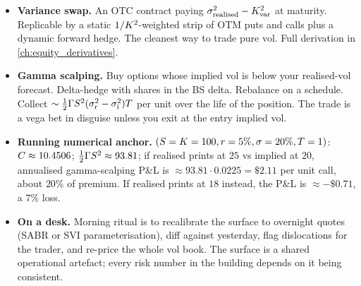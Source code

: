 \begin{itemize}
  re-priced to pay a permanent crash-insurance premium, and the
  downward equity skew has been in place ever since.
  \item \textbf{Variance swap.} An OTC contract paying
  $\sigma_{\text{realised}}^2 - K_{\text{var}}^2$ at
  maturity. Replicable by a static $1/K^2$-weighted strip
  of OTM puts and calls plus a dynamic forward hedge. The
  cleanest way to trade pure vol. Full derivation in
  \cref{ch:equity_derivatives}.
  \item \textbf{Gamma scalping.} Buy options whose implied vol
  is below your realised-vol forecast. Delta-hedge with shares
  in the BS delta. Rebalance on a schedule. Collect
  $\sim \tfrac12 \Gamma S^2 (\sigma_{\text{r}}^2 -
  \sigma_{\text{i}}^2) T$ per unit over the life of the
  position. The trade is a vega bet in disguise unless you exit
  at the entry implied vol.
  \item \textbf{Running numerical anchor.} $(S = K =
  100, r = 5\%, \sigma = 20\%, T = 1)$: $C \approx
  10.4506$; $\tfrac12 \Gamma S^2 \approx 93.81$; if realised
  prints at $25$ vs implied at $20$, annualised gamma-scalping
  P\&L is $\approx 93.81 \cdot 0.0225 = \$2.11$ per unit call,
  about $20\%$ of premium. If realised prints at $18$ instead,
  the P\&L is $\approx -\$0.71$, a $7\%$ loss.
  \item \textbf{On a desk.} Morning ritual is to recalibrate the
  surface to overnight quotes (SABR or SVI parameterisation),
  diff against yesterday, flag dislocations for the trader, and
  re-price the whole vol book. The surface is a shared
  operational artefact; every risk number in the building
  depends on it being consistent.
\end{itemize}
